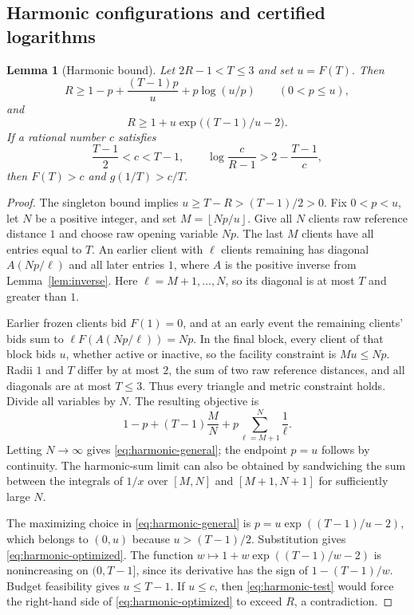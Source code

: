 \documentclass[11pt]{article}
\numberwithin{equation}{section}
\newtheorem{lemma}[theorem]{Lemma}
\theoremstyle{definition}
\newcommand{\fl}[1]{\left\lfloor#1\right\rfloor}
\begin{document}
\subsection{Harmonic configurations and certified logarithms}

\begin{lemma}[Harmonic bound]\label{lem:harmonic}
Let $2R-1<T\le3$ and set $u=F(T)$. Then
\begin{equation}\label{eq:harmonic-general}
 R\ge1-p+\frac{(T-1)p}{u}+p\log(u/p)
 \qquad(0<p\le u),
\end{equation}
and
\begin{equation}\label{eq:harmonic-optimized}
 R\ge1+u\exp\bigl((T-1)/u-2\bigr).
\end{equation}
If a rational number $c$ satisfies
\begin{equation}\label{eq:harmonic-test}
 \frac{T-1}{2}<c<T-1,
 \qquad
 \log\frac{c}{R-1}>2-\frac{T-1}{c},
\end{equation}
then $F(T)>c$ and $g(1/T)>c/T$.
\end{lemma}
\begin{proof}
The singleton bound implies $u\ge T-R>(T-1)/2>0$.
Fix $0<p<u$, let $N$ be a positive integer, and set
$M=\fl{Np/u}$. Give all $N$ clients raw reference distance $1$ and choose
raw opening variable $Np$. The last $M$ clients have all entries equal to
$T$. An earlier client with $\ell$ clients remaining has diagonal
$A(Np/\ell)$ and all later entries $1$, where $A$ is the positive inverse
from Lemma~\ref{lem:inverse}. Here $\ell=M+1,\ldots,N$, so its diagonal is
at most $T$ and greater than $1$.

Earlier frozen clients bid $F(1)=0$, and at an early event the remaining
clients' bids sum to $\ell F(A(Np/\ell))=Np$. In the final block, every
client of that block bids $u$, whether active or inactive, so the facility
constraint is $Mu\le Np$. Radii $1$ and $T$ differ by at most $2$, the sum
of two raw reference distances, and all diagonals are at most $T\le3$.
Thus every triangle and metric constraint holds. Divide all variables by
$N$. The resulting objective is
\[
 1-p+(T-1)\frac MN+p\sum_{\ell=M+1}^{N}\frac1\ell.
\]
Letting $N\to\infty$ gives \eqref{eq:harmonic-general}; the endpoint $p=u$
follows by continuity. The harmonic-sum limit can also be obtained by
sandwiching the sum between the integrals of $1/x$ over
$[M,N]$ and $[M+1,N+1]$ for sufficiently large $N$.

The maximizing choice in \eqref{eq:harmonic-general} is
$p=u\exp((T-1)/u-2)$, which belongs to $(0,u)$ because
$u>(T-1)/2$. Substitution gives \eqref{eq:harmonic-optimized}.
The function $w\mapsto1+w\exp((T-1)/w-2)$ is nonincreasing on
$(0,T-1]$, since its derivative has the sign of $1-(T-1)/w$.
Budget feasibility gives $u\le T-1$. If $u\le c$, then
\eqref{eq:harmonic-test} would force the right-hand side of
\eqref{eq:harmonic-optimized} to exceed $R$, a contradiction.
\end{proof}
\end{document}
